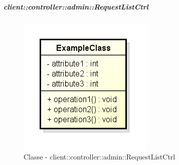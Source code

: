 		\subparagraph{client::controller::admin::RequestListCtrl} %
		\label{subp:bdsm_app_client_controller_admin_requestlistctrl}
			\begin{figure}[htbp]
				\centering
				\centerline{\includegraphics[scale=0.7]{./images/client/classes/example_class.png}}
				\caption{Classe - client::controller::admin::RequestListCtrl}
			\end{figure}
